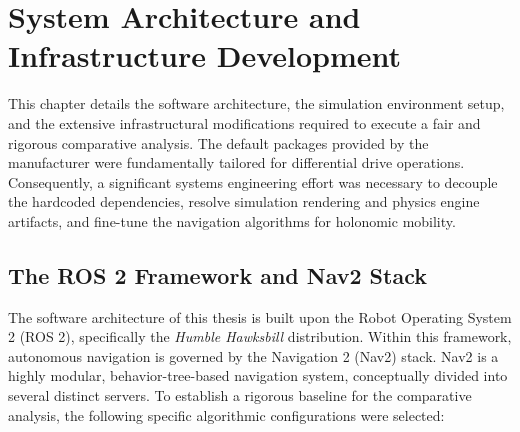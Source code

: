 
\chapter{System Architecture and Infrastructure Development}
\label{ch:architecture}

This chapter details the software architecture, the simulation environment setup, and the extensive infrastructural modifications required to execute a fair and rigorous comparative analysis. The default packages provided by the manufacturer were fundamentally tailored for differential drive operations. Consequently, a significant systems engineering effort was necessary to decouple the hardcoded dependencies, resolve simulation rendering and physics engine artifacts, and fine-tune the navigation algorithms for holonomic mobility.

\section{The ROS 2 Framework and Nav2 Stack}

The software architecture of this thesis is built upon the Robot Operating System 2 (ROS 2), specifically the \textit{Humble Hawksbill} distribution. Within this framework, autonomous navigation is governed by the Navigation 2 (Nav2) stack. Nav2 is a highly modular, behavior-tree-based navigation system, conceptually divided into several distinct servers. To establish a rigorous baseline for the comparative analysis, the following specific algorithmic configurations were selected:

